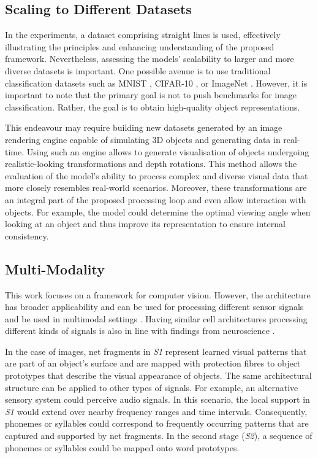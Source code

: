 \subsection{Scaling to Different Datasets}
In the experiments, a dataset comprising straight lines is used, effectively illustrating the principles and enhancing understanding of the proposed framework.
Nevertheless, assessing the models' scalability to larger and more diverse datasets is important.
One possible avenue is to use traditional classification datasets such as MNIST , CIFAR-10 , or ImageNet .
However, it is important to note that the primary goal is not to push benchmarks for image classification.
Rather, the goal is to obtain high-quality object representations.

This endeavour may require building new datasets generated by an image rendering engine capable of simulating 3D objects and generating data in real-time.
Using such an engine allows to generate visualisation of objects undergoing realistic-looking transformations and depth rotations.
This method allows the evaluation of the model's ability to process complex and diverse visual data that more closely resembles real-world scenarios.
Moreover, these transformations are an integral part of the proposed processing loop and even allow interaction with objects. For example, the model could determine the optimal viewing angle when looking at an object and thus improve its representation to ensure internal consistency.




\subsection{Multi-Modality}
This work focuses on a framework for computer vision. However, the architecture has broader applicability and can be used for processing different sensor signals and be used in multimodal settings \cite{ngiam_multimodal_2011, liu_learn_2018, baltrusaitis_multimodal_2019}.
Having similar cell architectures processing different kinds of signals is also in line with findings from neuroscience .

In the case of images, net fragments in \emph{S1} represent learned visual patterns that are part of an object's surface and are mapped with protection fibres to object prototypes that describe the visual appearance of objects. 
The same architectural structure can be applied to other types of signals. For example, an alternative sensory system could perceive audio signals. In this scenario, the local support in \emph{S1} would extend over nearby frequency ranges and time intervals. Consequently, phonemes or syllables could correspond to frequently occurring patterns that are captured and supported by net fragments. In the second stage (\emph{S2}), a sequence of phonemes or syllables could be mapped onto word prototypes.

